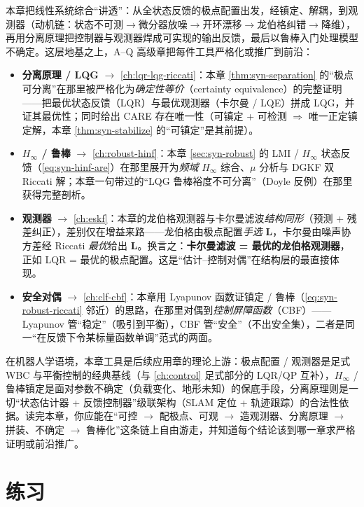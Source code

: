 本章把线性系统综合“讲透”：从全状态反馈的极点配置出发，经镇定、解耦，到观测器（动机链：状态不可测$\to$微分器放噪$\to$开环漂移$\to$龙伯格纠错$\to$降维），再用分离原理把控制器与观测器焊成可实现的输出反馈，最后以鲁棒入门处理模型不确定。这层地基之上，A--Q 高级章把每件工具严格化或推广到前沿：

\begin{itemize}
  \item \textbf{分离原理 / LQG} $\to$ \cref{ch:lqr-lqg-riccati}：本章 \cref{thm:syn-separation} 的“极点可分离”在那里被严格化为\emph{确定性等价}（certainty equivalence）的完整证明——把最优状态反馈（LQR）与最优观测器（卡尔曼 / LQE）拼成 LQG，并证其最优性；同时给出 CARE 存在唯一性（可镇定 + 可检测 $\Rightarrow$ 唯一正定镇定解，本章 \cref{thm:syn-stabilize} 的“可镇定”是其前提）。
  \item \textbf{$H_\infty$ / 鲁棒} $\to$ \cref{ch:robust-hinf}：本章 \cref{sec:syn-robust} 的 LMI / $H_\infty$ 状态反馈（\cref{eq:syn-hinf-are}）在那里展开为\emph{频域} $H_\infty$ 综合、$\mu$ 分析与 DGKF 双 Riccati 解；本章一句带过的“LQG 鲁棒裕度不可分离”（Doyle 反例）在那里获得完整剖析。
  \item \textbf{观测器} $\to$ \cref{ch:eskf}：本章的龙伯格观测器与卡尔曼滤波\emph{结构同形}（预测 + 残差纠正），差别仅在增益来路——龙伯格由极点配置\emph{手选} $\mathbf L$，卡尔曼由噪声协方差经 Riccati \emph{最优}给出 $\mathbf L$。换言之：\textbf{卡尔曼滤波 = 最优的龙伯格观测器}，正如 LQR = 最优的极点配置。这是“估计--控制对偶”在结构层的最直接体现。
  \item \textbf{安全对偶} $\to$ \cref{ch:clf-cbf}：本章用 Lyapunov 函数证镇定 / 鲁棒（\cref{eq:syn-robust-riccati} 邻近）的思路，在那里对偶到\emph{控制屏障函数}（CBF）——Lyapunov 管“稳定”（吸引到平衡），CBF 管“安全”（不出安全集），二者是同一“在反馈下令某标量函数单调”范式的两面。
\end{itemize}

\noindent 在机器人学语境，本章工具是后续应用章的理论上游：极点配置 / 观测器是足式 WBC 与平衡控制的经典基线（与 \cref{ch:control} 足式部分的 LQR/QP 互补），$H_\infty$ / 鲁棒镇定是面对参数不确定（负载变化、地形未知）的保底手段，分离原理则是一切“状态估计器 + 反馈控制器”级联架构（SLAM 定位 + 轨迹跟踪）的合法性依据。读完本章，你应能在“可控 $\to$ 配极点、可观 $\to$ 造观测器、分离原理 $\to$ 拼装、不确定 $\to$ 鲁棒化”这条链上自由游走，并知道每个结论该到哪一章求严格证明或前沿推广。

\section{练习}
\label{sec:syn-exercises}


